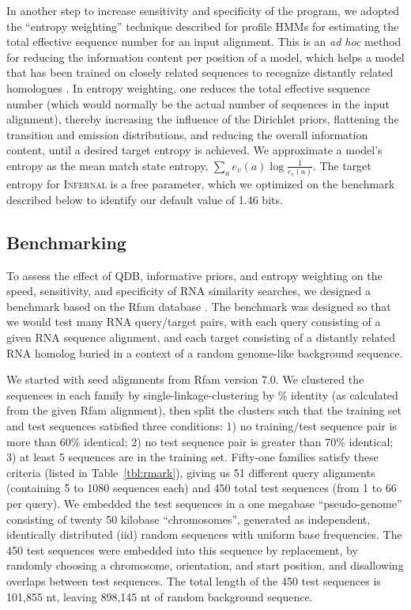 \documentclass[11pt]{article}
\begin{document}
In another step to increase sensitivity and specificity of the
program, we adopted the ``entropy weighting'' technique described for
profile HMMs \cite{Karplus98} for estimating the total effective
sequence number for an input alignment. This is an \emph{ad hoc}
method for reducing the information content per position of a model,
which helps a model that has been trained on closely related sequences
to recognize distantly related homologues \cite{Altschul91}. In
entropy weighting, one reduces the total effective sequence number
(which would normally be the actual number of sequences in the input
alignment), thereby increasing the influence of the Dirichlet priors,
flattening the transition and emission distributions, and reducing the
overall information content, until a desired target entropy is
achieved. We approximate a model's entropy as the mean match state
entropy, $\sum_a e_v(a) \log \frac{1}{e_v(a)}$. The target entropy for
\textsc{Infernal} is a free parameter, which we optimized on the
benchmark described below to identify our default value of 1.46 bits.

\subsection{Benchmarking}

To assess the effect of QDB, informative priors, and entropy weighting
on the speed, sensitivity, and specificity of RNA similarity searches,
we designed a benchmark based on the Rfam database
\cite{Griffiths-Jones05}. The benchmark was designed so that we would
test many RNA query/target pairs, with each query consisting of a
given RNA sequence alignment, and each target consisting of a
distantly related RNA homolog buried in a context of a random
genome-like background sequence.

We started with seed aligmnents from Rfam version 7.0. We clustered
the sequences in each family by single-linkage-clustering by \%
identity (as calculated from the given Rfam alignment), then split the
clusters such that the training set and test sequences satisfied three
conditions: 1) no training/test sequence pair is more than 60\%
identical; 2) no test sequence pair is greater than 70\% identical; 3)
at least 5 sequences are in the training set.  Fifty-one families
satisfy these criteria (listed in Table~\ref{tbl:rmark}), giving us 51
different query alignments (containing 5 to 1080 sequences each) and
450 total test sequences (from 1 to 66 per query).  We embedded the
test sequences in a one megabase ``pseudo-genome'' consisting of
twenty 50 kilobase ``chromosomes'', generated as independent,
identically distributed (iid) random sequences with uniform base
frequencies.  The 450 test sequences were embedded into this sequence
by replacement, by randomly choosing a chromosome, orientation, and
start position, and disallowing overlaps between test sequences. The
total length of the 450 test sequences is 101,855 nt, leaving 898,145
nt of random background sequence.
\end{document}
